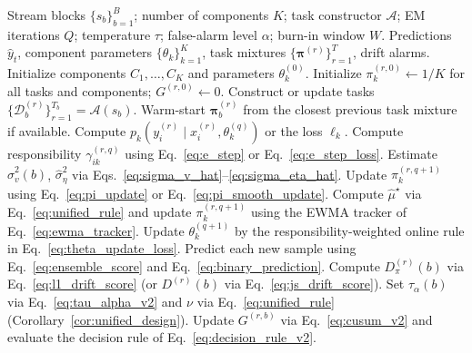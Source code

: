 ﻿\documentclass[12pt,a4paper]{article}
\DeclareMathOperator{\JS}{D_{JS}}
\newcommand{\calD}{\mathcal{D}}
\begin{document}
\begin{algorithm}[H]
\caption{EM-MTE: EM-Based Multi-Task Ensemble for Data Streams}
\label{alg:em_mte}
\begin{algorithmic}[1]
\REQUIRE Stream blocks $\{s_b\}_{b=1}^{B}$; number of components $K$; task
constructor $\mathcal{A}$; EM iterations $Q$; temperature $\tau$; false-alarm
level $\alpha$; burn-in window $W$.
\ENSURE Predictions $\hat{y}_t$, component parameters
$\{\theta_k\}_{k=1}^{K}$, task mixtures $\{\bm{\pi}^{(r)}\}_{r=1}^{T}$, drift
alarms.
\STATE Initialize components $C_1,\ldots,C_K$ and parameters $\theta_k^{(0)}$.
\STATE Initialize $\pi_k^{(r,0)}\leftarrow1/K$ for all tasks and components; $G^{(r,0)}\leftarrow0$.
  \STATE Construct or update tasks $\{\calD_b^{(r)}\}_{r=1}^{T_b}=\mathcal{A}(s_b)$.
  \STATE Warm-start $\bm{\pi}_b^{(r)}$ from the closest previous task mixture if available.
      \STATE Compute $p_k(y_i^{(r)}\mid x_i^{(r)},\theta_k^{(q)})$ or the loss $\ell_k$.
      \STATE Compute responsibility $\gamma_{ik}^{(r,q)}$ using Eq.~\eqref{eq:e_step} or Eq.~\eqref{eq:e_step_loss}.
    \ENDFOR
      \STATE Estimate $\hat\sigma_v^2(b)$, $\hat\sigma_\eta^2$ via Eqs.~\eqref{eq:sigma_v_hat}--\eqref{eq:sigma_eta_hat}.
        \STATE Update $\pi_k^{(r,q+1)}$ using Eq.~\eqref{eq:pi_update} or Eq.~\eqref{eq:pi_smooth_update}.
      \ELSE
        \STATE Compute $\hat\mu^\star$ via Eq.~\eqref{eq:unified_rule} and update $\pi_k^{(r,q+1)}$ using the EWMA tracker of Eq.~\eqref{eq:ewma_tracker}.
      \ENDIF
    \ENDFOR
      \STATE Update $\theta_k^{(q+1)}$ by the responsibility-weighted online rule in Eq.~\eqref{eq:theta_update_loss}.
    \ENDFOR
  \ENDFOR
  \STATE Predict each new sample using Eq.~\eqref{eq:ensemble_score} and Eq.~\eqref{eq:binary_prediction}.
  \STATE Compute $D_\pi^{(r)}(b)$ via Eq.~\eqref{eq:l1_drift_score} (or $D_{\JS}^{(r)}(b)$ via Eq.~\eqref{eq:js_drift_score}).
  \STATE Set $\tau_\alpha(b)$ via Eq.~\eqref{eq:tau_alpha_v2} and $\nu$ via Eq.~\eqref{eq:unified_rule} (Corollary~\ref{cor:unified_design}).
  \STATE Update $G^{(r,b)}$ via Eq.~\eqref{eq:cusum_v2} and evaluate the decision rule of Eq.~\eqref{eq:decision_rule_v2}.
\ENDFOR
\end{algorithmic}
\end{algorithm}
\end{document}
